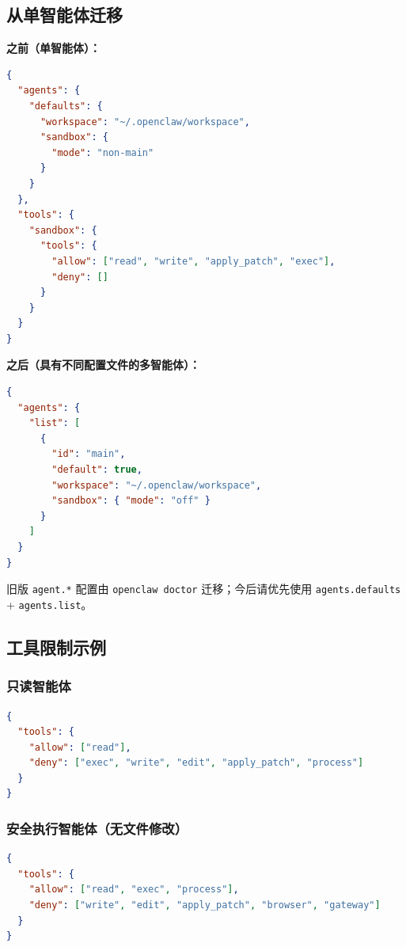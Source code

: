\hrulefill


\subsection{从单智能体迁移}


\textbf{之前（单智能体）：}

\begin{lstlisting}[language=json]
{
  "agents": {
    "defaults": {
      "workspace": "~/.openclaw/workspace",
      "sandbox": {
        "mode": "non-main"
      }
    }
  },
  "tools": {
    "sandbox": {
      "tools": {
        "allow": ["read", "write", "apply_patch", "exec"],
        "deny": []
      }
    }
  }
}
\end{lstlisting}


\textbf{之后（具有不同配置文件的多智能体）：}

\begin{lstlisting}[language=json]
{
  "agents": {
    "list": [
      {
        "id": "main",
        "default": true,
        "workspace": "~/.openclaw/workspace",
        "sandbox": { "mode": "off" }
      }
    ]
  }
}
\end{lstlisting}


旧版 \texttt{agent.*} 配置由 \texttt{openclaw doctor} 迁移；今后请优先使用 \texttt{agents.defaults} + \texttt{agents.list}。

\hrulefill


\subsection{工具限制示例}


\subsubsection{只读智能体}


\begin{lstlisting}[language=json]
{
  "tools": {
    "allow": ["read"],
    "deny": ["exec", "write", "edit", "apply_patch", "process"]
  }
}
\end{lstlisting}


\subsubsection{安全执行智能体（无文件修改）}


\begin{lstlisting}[language=json]
{
  "tools": {
    "allow": ["read", "exec", "process"],
    "deny": ["write", "edit", "apply_patch", "browser", "gateway"]
  }
}
\end{lstlisting}


